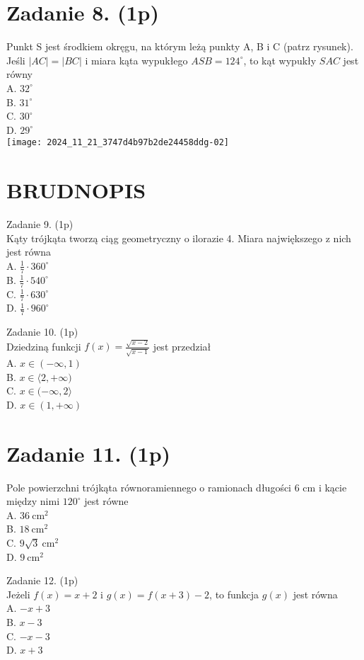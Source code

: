 \documentclass[10pt]{article}
\begin{document}
\section*{Zadanie 8. (1p)}
Punkt S jest środkiem okręgu, na którym leżą punkty A, B i C (patrz rysunek). Jeśli \(|A C|=|B C|\) i miara kąta wypukłego \(A S B=124^{\circ}\), to kąt wypukły \(S A C\) jest równy\\
A. \(32^{\circ}\)\\
B. \(31^{\circ}\)\\
C. \(30^{\circ}\)\\
D. \(29^{\circ}\)\\
\texttt{[image: 2024\_11\_21\_3747d4b97b2de24458ddg-02]}

\section*{BRUDNOPIS}
Zadanie 9. (1p)\\
Kąty trójkąta tworzą ciąg geometryczny o ilorazie 4. Miara największego z nich jest równa\\
A. \(\frac{1}{7} \cdot 360^{\circ}\)\\
B. \(\frac{1}{7} \cdot 540^{\circ}\)\\
C. \(\frac{1}{7} \cdot 630^{\circ}\)\\
D. \(\frac{1}{7} \cdot 960^{\circ}\)

Zadanie 10. (1p)\\
Dziedziną funkcji \(f(x)=\frac{\sqrt{x-2}}{\sqrt{x-1}}\) jest przedział\\
A. \(x \in(-\infty, 1)\)\\
B. \(x \in\langle 2,+\infty)\)\\
C. \(x \in(-\infty, 2\rangle\)\\
D. \(x \in(1,+\infty)\)

\section*{Zadanie 11. (1p)}
Pole powierzchni trójkąta równoramiennego o ramionach długości 6 cm i kącie między nimi \(120^{\circ}\) jest równe\\
A. \(36 \mathrm{~cm}^{2}\)\\
B. \(18 \mathrm{~cm}^{2}\)\\
C. \(9 \sqrt{3} \mathrm{~cm}^{2}\)\\
D. \(9 \mathrm{~cm}^{2}\)

Zadanie 12. (1p)\\
Jeżeli \(f(x)=x+2\) i \(g(x)=f(x+3)-2\), to funkcja \(g(x)\) jest równa\\
A. \(-x+3\)\\
B. \(x-3\)\\
C. \(-x-3\)\\
D. \(x+3\)
\end{document}
